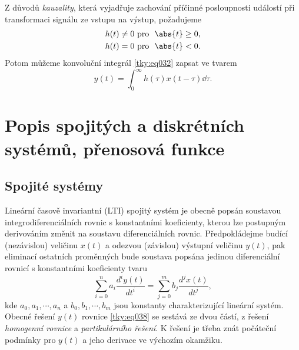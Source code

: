       Z důvodů \emph{kauzality}, která vyjadřuje zachování příčinné posloupnosti událostí při 
      transformaci signálu ze vstupu na výstup, požadujeme
      \begin{align}\label{tky:eq036}
        h(t) &\neq  0 \text{   pro } \abs{t} \geq0, \\
        h(t) &  =   0 \text{   pro } \abs{t} < 0. 
      \end{align}    
      Potom můžeme konvoluční integrál \ref{tky:eq032} zapsat ve tvarem
      \begin{equation}\label{tky:eq037}
         y(t) = \int_0^{\infty}h(\tau)x(t-\tau)\dd\tau.
      \end{equation} 
  
  \section{Popis spojitých a diskrétních systémů, přenosová funkce}\label{tky:IchIIsecIII}
    \subsection{Spojité systémy}\label{tky:IchIIsecIIIssecI}
      Lineární časově invariantní (\textsc{LTI}) spojitý systém je obecně popsán soustavou
      integrodiferenciálních rovnic s konstantními koeficienty, kterou lze postupným derivováním
      změnit na soustavu diferenciálních rovnic. Předpokládejme budící (nezávislou) veličinu
      $x(t)$ a odezvou (závislou) výstupní veličinu $y(t)$, pak eliminací ostatních proměnných bude
      soustava popsána jedinou diferenciální rovnicí s konstantními koeficienty tvaru
      \begin{equation}\label{tky:eq038}
          \sum_{i=0}^na_i\frac{d^iy(t)}{dt^i}=\sum_{j=0}^mb_j\frac{d^jx(t)}{dt^j},
      \end{equation}
      kde $a_0, a_1, \cdots ,a_n$ a $b_0, b_1, \cdots ,b_m$ jsou konstanty charakterizující lineární
      systém. Obecné řešení $y(t)$ rovnice \ref{tky:eq038} se sestává ze dvou částí, z 
      řešení \emph{homogenní rovnice} a \emph{partikulárního řešení}. K řešení je třeba znát 
      počáteční podmínky pro $y(t)$ a jeho derivace ve výchozím okamžiku.
  
